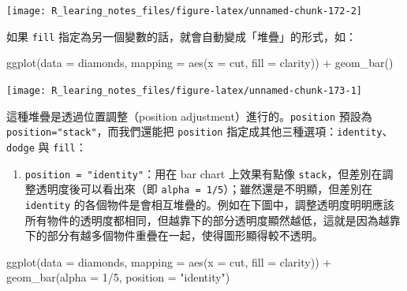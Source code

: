 \documentclass[
]{book}
\newenvironment{Shaded}{\begin{snugshade}}{\end{snugshade}}
\newcommand{\AttributeTok}[1]{\textcolor[rgb]{0.77,0.63,0.00}{#1}}
\newcommand{\DecValTok}[1]{\textcolor[rgb]{0.00,0.00,0.81}{#1}}
\newcommand{\FunctionTok}[1]{\textcolor[rgb]{0.00,0.00,0.00}{#1}}
\newcommand{\NormalTok}[1]{#1}
\newcommand{\SpecialCharTok}[1]{\textcolor[rgb]{0.00,0.00,0.00}{#1}}
\newcommand{\StringTok}[1]{\textcolor[rgb]{0.31,0.60,0.02}{#1}}
\providecommand{\tightlist}{%
  \setlength{\itemsep}{0pt}\setlength{\parskip}{0pt}}
\theoremstyle{definition}
\theoremstyle{remark}
\begin{document}
\begin{center}\texttt{[image: R\_learing\_notes\_files/figure-latex/unnamed-chunk-172-2]} \end{center}

如果 \texttt{fill} 指定為另一個變數的話，就會自動變成「堆疊」的形式，如：

\begin{Shaded}
\begin{Highlighting}[]
\FunctionTok{ggplot}\NormalTok{(}\AttributeTok{data =}\NormalTok{ diamonds, }\AttributeTok{mapping =} \FunctionTok{aes}\NormalTok{(}\AttributeTok{x =}\NormalTok{ cut, }\AttributeTok{fill =}\NormalTok{ clarity)) }\SpecialCharTok{+} 
  \FunctionTok{geom\_bar}\NormalTok{()}
\end{Highlighting}
\end{Shaded}

\begin{center}\texttt{[image: R\_learing\_notes\_files/figure-latex/unnamed-chunk-173-1]} \end{center}

這種堆疊是透過位置調整（position adjustment）進行的。\texttt{position} 預設為 \texttt{position="stack"}，而我們還能把 \texttt{position} 指定成其他三種選項：\texttt{identity}、\texttt{dodge} 與 \texttt{fill}：

\begin{enumerate}
\def\labelenumi{\arabic{enumi}.}
\tightlist
\item
  \texttt{position\ =\ "identity"}：用在 bar chart 上效果有點像 \texttt{stack}，但差別在調整透明度後可以看出來（即 \texttt{alpha\ =\ 1/5}）；雖然還是不明顯，但差別在 \texttt{identity} 的各個物件是會相互堆疊的。例如在下圖中，調整透明度明明應該所有物件的透明度都相同，但越靠下的部分透明度顯然越低，這就是因為越靠下的部分有越多個物件重疊在一起，使得圖形顯得較不透明。
\end{enumerate}

\begin{Shaded}
\begin{Highlighting}[]
\FunctionTok{ggplot}\NormalTok{(}\AttributeTok{data =}\NormalTok{ diamonds, }\AttributeTok{mapping =} \FunctionTok{aes}\NormalTok{(}\AttributeTok{x =}\NormalTok{ cut, }\AttributeTok{fill =}\NormalTok{ clarity)) }\SpecialCharTok{+}
  \FunctionTok{geom\_bar}\NormalTok{(}\AttributeTok{alpha =} \DecValTok{1}\SpecialCharTok{/}\DecValTok{5}\NormalTok{, }\AttributeTok{position =} \StringTok{"identity"}\NormalTok{)}
\end{Highlighting}
\end{Shaded}
\end{document}
